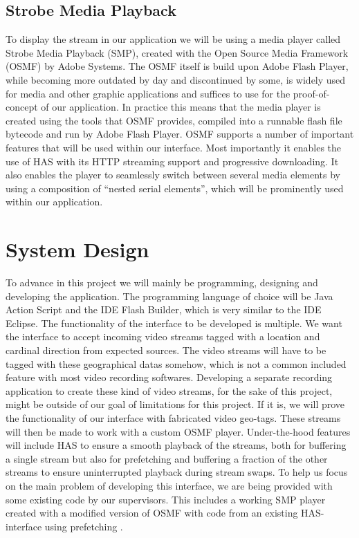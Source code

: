 \documentclass[9pt,a4paper]{acmproc}
\begin{document}
\subsection{Strobe Media Playback}

To display the stream in our application we will be using a media player called Strobe Media Playback (SMP), created with the Open Source Media Framework (OSMF) by Adobe Systems. The OSMF itself is build upon Adobe Flash Player, while becoming more outdated by day and discontinued by some, is widely used for media and other graphic applications and suffices to use for the proof-of-concept of our application. In practice this means that the media player is created using the tools that OSMF provides, compiled into a runnable flash file bytecode and run by Adobe Flash Player. 
OSMF supports a number of important features that will be used within our interface. Most importantly it enables the use of HAS with its HTTP streaming support and progressive downloading. It also enables the player to seamlessly switch between several media elements by using a composition of “nested serial elements”, which will be prominently used within our application.\cite{osmf}

\section{System Design}

To advance in this project we will mainly be programming, designing and developing the application. The programming language of choice will be Java Action Script and the IDE Flash Builder, which is very similar to the IDE Eclipse. The functionality of the interface to be developed is multiple. We want the interface to accept incoming video streams tagged with a location and cardinal direction from expected sources. The video streams will have to be tagged with these geographical datas somehow, which is not a common included feature with most video recording softwares. Developing a separate recording application to create these kind of video streams, for the sake of this project, might be outside of our goal of limitations for this project. If it is, we will prove the functionality of our interface with fabricated video geo-tags. These streams will then be made to work with a custom OSMF player.  Under-the-hood features will include HAS to ensure a smooth playback of the streams, both for buffering a single stream but also for prefetching and buffering a fraction of the other streams to ensure uninterrupted playback during stream swaps. To help us focus on the main problem of developing this interface, we are being provided with some existing code by our supervisors. This includes a working SMP player created with a modified version of OSMF with code from an existing HAS-interface using prefetching \cite{qualbranch}.
\end{document}
